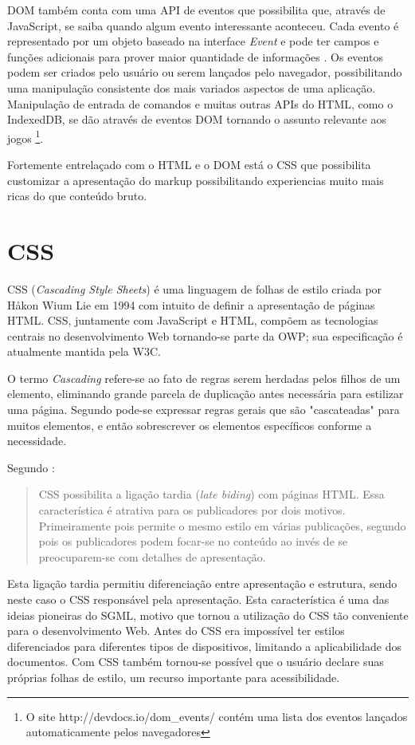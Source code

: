 DOM também conta com uma API de eventos que possibilita que, através
de JavaScript, se saiba quando algum evento interessante aconteceu.
Cada evento é representado por um objeto baseado na interface
\textit{Event} e pode ter campos e funções adicionais para prover
maior quantidade de informações \autocite{devdocs}. Os eventos
podem ser criados pelo usuário ou serem lançados pelo navegador,
possibilitando uma manipulação consistente dos mais variados
aspectos de uma aplicação. Manipulação de entrada de comandos e
muitas outras APIs do HTML, como o IndexedDB, se dão através
de eventos DOM tornando o assunto relevante aos jogos \footnote{O site
http://devdocs.io/dom\_events/ contém uma lista dos eventos lançados
automaticamente pelos navegadores}.

Fortemente entrelaçado com o HTML e o DOM está o CSS que possibilita
customizar a apresentação do markup possibilitando experiencias muito
mais ricas do que conteúdo bruto.
\section{CSS}
CSS (\textit{Cascading Style Sheets}) é uma linguagem de folhas de
estilo criada por Håkon Wium Lie em 1994 com intuito de definir a
apresentação de páginas HTML. CSS, juntamente com JavaScript e HTML,
compõem as tecnologias centrais no desenvolvimento Web tornando-se
parte da OWP; sua especificação é atualmente mantida pela W3C.

O termo \textit{Cascading} refere-se ao fato de regras serem
herdadas pelos filhos de um elemento, eliminando grande parcela de
duplicação antes necessária para estilizar uma página. Segundo
\citet{html5mostwanted} pode-se expressar regras gerais que são
"cascateadas" para muitos elementos, e então sobrescrever os elementos
específicos conforme a necessidade.

Segundo \citet[p. 23--24]{CascadingStyleSheets}:
\begin{quote}
CSS possibilita a ligação tardia (\textit{late biding}) com
páginas HTML. Essa característica é atrativa para os publicadores
por dois motivos. Primeiramente pois permite o mesmo estilo em várias
publicações, segundo pois os publicadores podem focar-se no conteúdo
ao invés de se preocuparem-se com detalhes de apresentação.
\end{quote}

Esta ligação tardia permitiu diferenciação entre apresentação e
estrutura, sendo neste caso o CSS responsável pela apresentação. Esta
característica é uma das ideias pioneiras do SGML, motivo que tornou a
utilização do CSS tão conveniente para o desenvolvimento Web.
Antes do CSS era impossível ter estilos diferenciados para diferentes
tipos de dispositivos, limitando a aplicabilidade dos documentos.
Com CSS também tornou-se possível que o usuário declare suas próprias
folhas de estilo, um recurso importante para acessibilidade.

